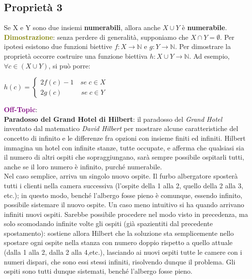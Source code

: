 \subsection{Proprietà 3}
Se X e Y sono due insiemi \textbf{numerabili}, allora anche $X \cup Y$ è \textbf{numerabile}. \\
\textcolor{olive}{\textbf{Dimostrazione}}: senza perdere di generalità, supponiamo che $X \cap Y = \emptyset$. Per ipotesi esistono due funzioni biettive $f : X \rightarrow \mathbb{N}$ e $g : Y \rightarrow \mathbb{N}$. Per dimostrare la proprietà occorre costruire una funzione biettiva $h : X \cup Y \rightarrow \mathbb{N}$. Ad esempio, $\forall c \in (X \cup Y)$, si può porre:
\begin{center}
    \begin{math}
        h(c) = 
        \begin{cases}
            2f(c) - 1 \quad se \; c \in X \\
            2g(c) \;\;\; \qquad se \; c \in Y
        \end{cases}
    \end{math}
\end{center}

\begin{boxA}
    \textcolor{purple}{\textbf{Off-Topic}}: \\
    \textbf{Paradosso del Grand Hotel di Hilbert}: il paradosso del \textit{Grand Hotel} inventato dal matematico \textit{David Hilbert} per mostrare alcune caratteristiche del concetto di infinito e le differenze fra opzioni con insieme finiti ed infiniti. Hilbert immagina un hotel con infinite stanze, tutte occupate, e afferma che qualsiasi sia il numero di altri ospiti che sopraggiungano, sarà sempre possibile ospitarli tutti, anche se il loro numero è infinito, purché numerabile. \\
    Nel caso semplice, arriva un singolo nuovo ospite. Il furbo albergatore sposterà tutti i clienti nella camera successiva (l'ospite della 1 alla 2, quello della 2 alla 3, etc.); in questo modo, benché l'albergo fosse pieno è comunque, essendo infinito, possibile sistemare il nuovo ospite.
    Un caso meno intuitivo si ha quando arrivano infiniti nuovi ospiti. Sarebbe possibile procedere nel modo visto in precedenza, ma solo scomodando infinite volte gli ospiti (già spazientiti dal precedente spostamento): sostiene allora Hilbert che la soluzione sta semplicemente nello spostare ogni ospite nella stanza con numero doppio rispetto a quello attuale (dalla 1 alla 2, dalla 2 alla 4,etc.), lasciando ai nuovi ospiti tutte le camere con i numeri dispari, che sono essi stessi infiniti, risolvendo dunque il problema. Gli ospiti sono tutti dunque sistemati, benché l'albergo fosse pieno.
\end{boxA}


